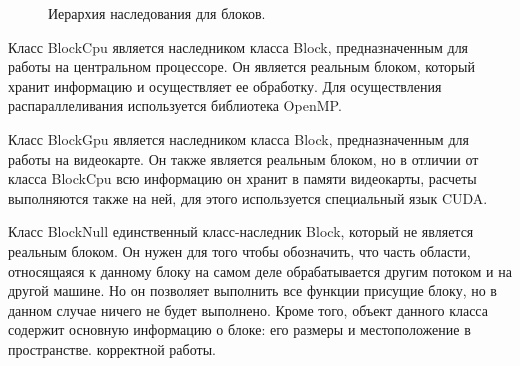 \documentclass[a4paper, 14pt]{article}
\theoremstyle{definition}
\begin{document}
\begin{figure}[h]
	\caption{Иерархия наследования для блоков.}
	\label{ris:blocks}
\end{figure}

\par Класс BlockCpu является наследником класса Block, предназначенным для работы на центральном процессоре. Он является реальным блоком, который хранит информацию и осуществляет ее обработку. Для осуществления распараллеливания используется библиотека OpenMP.

\par Класс BlockGpu является наследником класса Block, предназначенным для работы на видеокарте. Он также является реальным блоком, но в отличии от класса BlockCpu всю информацию он хранит в памяти видеокарты, расчеты выполняются также на ней, для этого используется специальный язык CUDA.

\par Класс BlockNull единственный класс-наследник Block, который не является реальным блоком. Он нужен для того чтобы обозначить, что часть области, относящаяся к данному блоку на самом деле обрабатывается другим потоком и на другой машине. Но он позволяет выполнить все функции присущие блоку, но в данном случае ничего не будет выполнено. Кроме того, объект данного класса содержит основную информацию о блоке: его размеры и местоположение в пространстве.
корректной работы.
\end{document}
